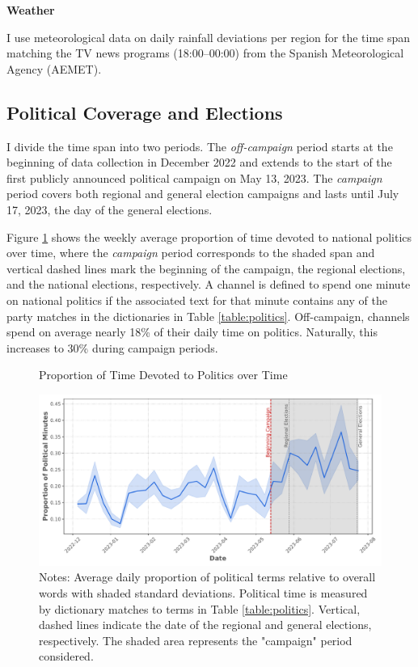 \documentclass[12pt]{article}
\begin{document}
	\textbf{Weather}
	
	I use meteorological data on daily rainfall deviations per region for the time span matching the TV news programs (18:00–00:00) from the Spanish Meteorological Agency (AEMET).
	
	\subsection{Political Coverage and Elections}
	
	I divide the time span into two periods. The \textit{off-campaign} period starts at the beginning of data collection in December 2022 and extends to the start of the first publicly announced political campaign on May 13, 2023. The \textit{campaign} period covers both regional and general election campaigns and lasts until July 17, 2023, the day of the general elections.
	
	Figure \ref{fig:coverage} shows the weekly average proportion of time devoted to national politics over time, where the \textit{campaign} period corresponds to the shaded span and vertical dashed lines mark the beginning of the campaign, the regional elections, and the national elections, respectively. A channel is defined to spend one minute on national politics if the associated text for that minute contains any of the party matches in the dictionaries in Table \ref{table:politics}. Off-campaign, channels spend on average nearly 18\% of their daily time on politics. Naturally, this increases to 30\% during campaign periods.
	
	
	\begin{figure}[ht!]
		\caption{Proportion of Time Devoted to Politics over Time}
		\centering
		\includegraphics[width=120mm]{figures/political_words2}
		\caption*{\small Notes: Average daily proportion of political terms relative to overall words with shaded standard deviations. Political time is measured by dictionary matches to terms in Table \ref{table:politics}. Vertical, dashed lines indicate the date of the regional and general elections, respectively. The shaded area represents the "campaign" period considered.}
		\label{fig:coverage}
	\end{figure}
	
\end{document}
